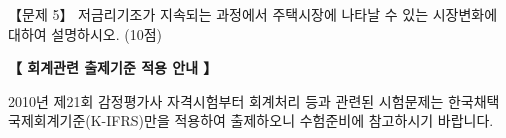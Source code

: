 \begin{longquestion}{【문제 5】}
저금리기조가 지속되는 과정에서 주택시장에 나타날 수 있는 시장변화에 대하여 설명하시오. (10점) \par
\medskip
\begin{framedtext}
\centering\textbf{【 회계관련 출제기준 적용 안내 】}\par
2010년 제21회 감정평가사 자격시험부터 회계처리 등과 관련된 시험문제는 한국채택국제회계기준(K-IFRS)만을 적용하여 출제하오니 수험준비에 참고하시기 바랍니다.
\end{framedtext}
\end{longquestion}
